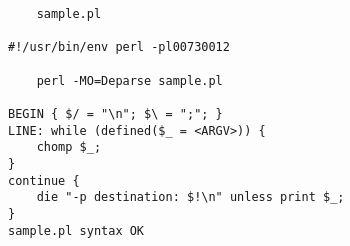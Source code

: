 \begin{verbatim}
	sample.pl

#!/usr/bin/env perl -pl00730012

	perl -MO=Deparse sample.pl

BEGIN { $/ = "\n"; $\ = ";"; }
LINE: while (defined($_ = <ARGV>)) {
	chomp $_;
}
continue {
	die "-p destination: $!\n" unless print $_;
}
sample.pl syntax OK
\end{verbatim}